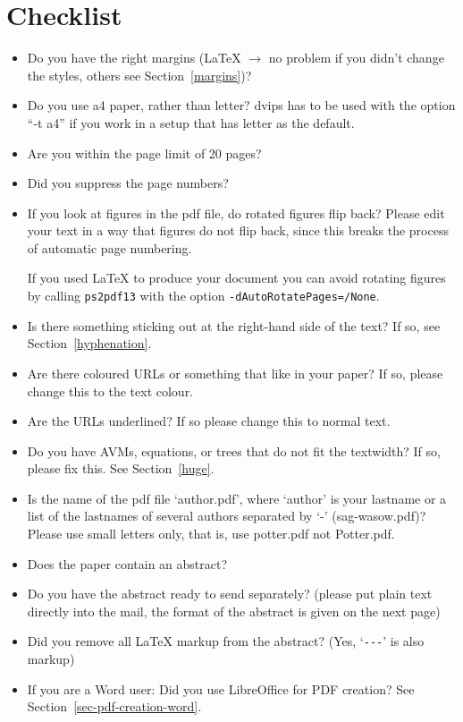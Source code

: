 \documentclass[11pt,a4paper,fleqn]{article}
\begin{document}
\section{Checklist}

\begin{itemize}
\item Do you have the right margins (\LaTeX{} $\to$ no problem if you didn't change
      the styles, others see Section~\ref{margins})?
\item Do you use a4 paper, rather than letter? dvips has to be used with the option ``-t a4'' if you
  work in a setup that has letter as the default.
\item Are you within the page limit of 20 pages?
\item Did you suppress the page numbers?
\item If you look at figures in the pdf file, do rotated figures flip back?
      Please edit your text in a way that figures do not flip back, since this
      breaks the process of automatic page numbering.

If you used \LaTeX{} to produce your document you can avoid rotating figures by calling
\verb+ps2pdf13+ with the option \verb+-dAutoRotatePages=/None+.
\item Is there something sticking out at the right-hand side of the text?
      If so, see Section~\ref{hyphenation}.
\item Are there coloured URLs or something that like in your paper? If so,
      please change this to the text colour.
\item Are the URLs underlined? If so please change this to normal text.
\item Do you have AVMs, equations, or trees that do not fit the textwidth?
      If so, please fix this. See Section~\ref{huge}.
\item Is the name of the pdf file `author.pdf', where `author' is your lastname or a list of the lastnames of several authors
      separated by `-' (sag-wasow.pdf)? Please use small letters only, that is, use potter.pdf not Potter.pdf.
\item Does the paper contain an abstract?
\item Do you have the abstract ready to send separately? (please put plain text directly into the mail, the
format of the abstract is given on the next page)
\item Did you remove all \LaTeX{} markup from the abstract? (Yes, `\verb+---+' is also markup)
\item If you are a Word user: Did you use LibreOffice for PDF creation? See Section~\ref{sec-pdf-creation-word}.
\end{itemize}
\end{document}
